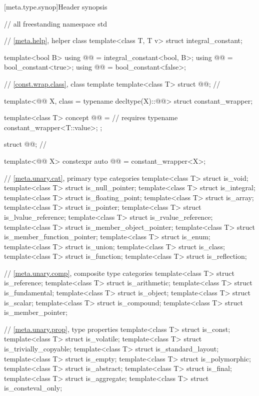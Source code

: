 [meta.type.synop]{Header  synopsis}

%
\begin{codeblock}
// all freestanding
namespace std {
  // \ref{meta.help}, helper class
  template<class T, T v> struct integral_constant;

  template<bool B>
    using @@ = integral_constant<bool, B>;
  using @@  = bool_constant<true>;
  using @@ = bool_constant<false>;

  // \ref{const.wrap.class}, class template 
  template<class T>
    struct @@;                                      // \expos

  template<@@ X, class = typename decltype(X)::@@>
    struct constant_wrapper;

  template<class T>
    concept @@ =                                   // \expos
      requires { typename constant_wrapper<T::value>; };

  struct @@;                                          // \expos

  template<@@ X>
    constexpr auto @@ = constant_wrapper<X>{};

  // \ref{meta.unary.cat}, primary type categories
  template<class T> struct is_void;
  template<class T> struct is_null_pointer;
  template<class T> struct is_integral;
  template<class T> struct is_floating_point;
  template<class T> struct is_array;
  template<class T> struct is_pointer;
  template<class T> struct is_lvalue_reference;
  template<class T> struct is_rvalue_reference;
  template<class T> struct is_member_object_pointer;
  template<class T> struct is_member_function_pointer;
  template<class T> struct is_enum;
  template<class T> struct is_union;
  template<class T> struct is_class;
  template<class T> struct is_function;
  template<class T> struct is_reflection;

  // \ref{meta.unary.comp}, composite type categories
  template<class T> struct is_reference;
  template<class T> struct is_arithmetic;
  template<class T> struct is_fundamental;
  template<class T> struct is_object;
  template<class T> struct is_scalar;
  template<class T> struct is_compound;
  template<class T> struct is_member_pointer;

  // \ref{meta.unary.prop}, type properties
  template<class T> struct is_const;
  template<class T> struct is_volatile;
  template<class T> struct is_trivially_copyable;
  template<class T> struct is_standard_layout;
  template<class T> struct is_empty;
  template<class T> struct is_polymorphic;
  template<class T> struct is_abstract;
  template<class T> struct is_final;
  template<class T> struct is_aggregate;
  template<class T> struct is_consteval_only;

}
\end{codeblock}
